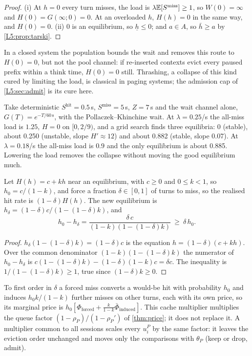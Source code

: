\begin{proof}
(i) At $h=0$ every turn misses, the load is $\lambda\mathbb{E}[S^{\mathrm{miss}}]\ge1$, so
$W(0)=\infty$ and $H(0)=G(\infty;0)=0$. At an overloaded $h$, $H(h)=0$ in the same way,
and $H(0)=0$. (ii) 0 is an equilibrium, so $\underline h\le0$; and $a\in A$, so
$\bar h\ge a$ by \cref{L5:prop:tarski}.
\end{proof}

In a closed system the population bounds the wait and removes this route to $H(0)=0$,
but not the pool channel: if re-inserted contexts evict every paused prefix within a
think time, $H(0)=0$ still. Thrashing, a collapse of this kind cured by limiting the
load, is classical in paging systems; the admission cap of \cref{L5:sec:admit} is its
cure here.

\begin{example}\label{L5:ex:bistable}
Take deterministic $S^{\mathrm{hit}}=0.5$\,s, $S^{\mathrm{miss}}=5$\,s, $Z=7$\,s and the
wait channel alone, $G(T)=e^{-T/60\,\mathrm{s}}$, with the Pollaczek--Khinchine wait. At
$\lambda=0.25$/s the all-miss load is $1.25$, $H=0$ on $[0,2/9)$, and a grid search finds
three equilibria: 0 (stable), about 0.250 (unstable, slope $H'\approx12$) and about
0.882 (stable, slope 0.07). At $\lambda=0.18$/s the all-miss load is $0.9$ and the only
equilibrium is about 0.885. Lowering the load removes the collapse without moving the
good equilibrium much.
\end{example}

\begin{proposition}\label{L5:prop:multiplier}
Let $H(h)=c+kh$ near an equilibrium, with $c\ge0$ and $0\le k<1$, so $h_0=c/(1-k)$, and
force a fraction $\delta\in[0,1]$ of turns to miss, so the realised hit rate is
$(1-\delta)H(h)$. The new equilibrium is $h_\delta=(1-\delta)c/(1-(1-\delta)k)$, and
\[
  h_0-h_\delta=\frac{\delta\,c}{(1-k)(1-(1-\delta)k)}\ \ge\ \delta\,h_0 .
\]
\end{proposition}

\begin{proof}
$h_\delta(1-(1-\delta)k)=(1-\delta)c$ is the equation $h=(1-\delta)(c+kh)$. Over the
common denominator $(1-k)(1-(1-\delta)k)$ the numerator of $h_0-h_\delta$ is
$c(1-(1-\delta)k)-(1-\delta)(1-k)c=\delta c$. The inequality is
$1/(1-(1-\delta)k)\ge1$, true since $(1-\delta)k\ge0$.
\end{proof}

To first order in $\delta$ a forced miss converts a would-be hit with probability $h_0$
and induces $h_0k/(1-k)$ further misses on other turns, each with its own price, so its
marginal price is $h_0[\Phi_{\mathrm{forced}}+\tfrac{k}{1-k}\bar\Phi_{\mathrm{induced}}]$.
This cache multiplier multiplies the queue factor $(1-\rho_P)/(1-\rho_P')$ of
\cref{thm:price}; it does not replace it. A multiplier common to all sessions scales
every $u^P_i$ by the same factor: it leaves the eviction order unchanged and moves only
the comparisons with $\theta_P$ (keep or drop, admit).

